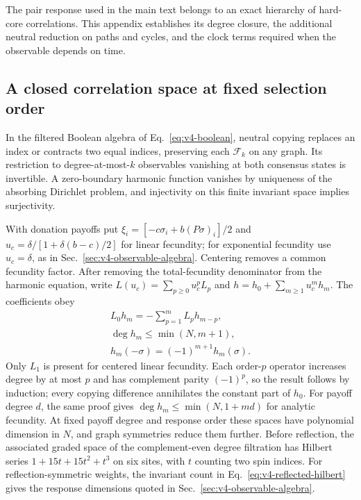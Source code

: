 \documentclass[aps,pre,reprint,amsmath,amssymb,longbibliography]{revtex4-2}
\begin{document}
The pair response used in the main text belongs to an exact hierarchy
of hard-core correlations. This appendix establishes its degree closure,
the additional neutral reduction on paths and cycles, and the clock
terms required when the observable depends on time.

\subsection{A closed correlation space at fixed selection order}
\label{app:v3-degree-closure}

In the filtered Boolean algebra of Eq.~\eqref{eq:v4-boolean}, neutral
copying replaces an index or contracts two equal indices, preserving
each $\mathscr F_k$ on any graph. Its restriction to degree-at-most-$k$ observables vanishing
at both consensus states is invertible.  A zero-boundary harmonic
function vanishes by uniqueness of the absorbing Dirichlet problem, and
injectivity on this finite invariant space implies surjectivity.

With donation payoffs put
$\xi_i=[-c\sigma_i+b(P\sigma)_i]/2$ and
$u_c=\delta/[1+\delta(b-c)/2]$ for linear fecundity; for exponential
fecundity use $u_c=\delta$, as in Sec.~\ref{sec:v4-observable-algebra}.
Centering removes a common fecundity factor.
After removing the total-fecundity denominator from the harmonic equation,
write $L(u_c)=\sum_{p\ge0}u_c^pL_p$ and
$h=h_0+\sum_{m\ge1}u_c^mh_m$.
The coefficients obey
\begin{equation}
 \begin{gathered}
 L_0h_m=-\sum_{p=1}^mL_ph_{m-p},\\
 \deg h_m\le\min(N,m+1),\\
 h_m(-\sigma)=(-1)^{m+1}h_m(\sigma).
 \end{gathered}
 \label{eq:v3-harmonic-filtration}
\end{equation}
Only $L_1$ is present for centered linear fecundity. Each order-$p$
operator increases degree by at most $p$ and has complement parity
$(-1)^p$, so the result follows by induction; every copying difference
annihilates the constant part of $h_0$. For payoff degree $d$, the same
proof gives $\deg h_m\le\min(N,1+md)$ for analytic fecundity.
At fixed payoff degree and response order these spaces have polynomial
dimension in $N$, and graph symmetries reduce them further.
Before reflection, the associated graded space of the complement-even degree filtration
has Hilbert series $1+15t+15t^2+t^3$ on six sites, with $t$ counting
two spin indices.
For reflection-symmetric weights, the invariant count in
Eq.~\eqref{eq:v4-reflected-hilbert} gives the response dimensions quoted
in Sec.~\ref{sec:v4-observable-algebra}.
\end{document}
